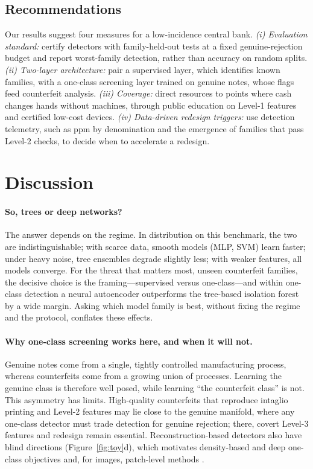 \documentclass{article}
\theoremstyle{definition}
\theoremstyle{remark}
\begin{document}
\subsection{Recommendations}

Our results suggest four measures for a low-incidence central bank. \emph{(i) Evaluation standard:} certify detectors with family-held-out tests at a fixed genuine-rejection budget and report worst-family detection, rather than accuracy on random splits. \emph{(ii) Two-layer architecture:} pair a supervised layer, which identifies known families, with a one-class screening layer trained on genuine notes, whose flags feed counterfeit analysis. \emph{(iii) Coverage:} direct resources to points where cash changes hands without machines, through public education on Level-1 features and certified low-cost devices. \emph{(iv) Data-driven redesign triggers:} use detection telemetry, such as ppm by denomination and the emergence of families that pass Level-2 checks, to decide when to accelerate a redesign.

\section{Discussion}
\label{sec:discussion}

\paragraph{So, trees or deep networks?} The answer depends on the regime. In distribution on this benchmark, the two are indistinguishable; with scarce data, smooth models (MLP, SVM) learn faster; under heavy noise, tree ensembles degrade slightly less; with weaker features, all models converge. For the threat that matters most, unseen counterfeit families, the decisive choice is the framing---supervised versus one-class---and within one-class detection a neural autoencoder outperforms the tree-based isolation forest by a wide margin. Asking which model family is best, without fixing the regime and the protocol, conflates these effects.

\paragraph{Why one-class screening works here, and when it will not.} Genuine notes come from a single, tightly controlled manufacturing process, whereas counterfeits come from a growing union of processes. Learning the genuine class is therefore well posed, while learning ``the counterfeit class'' is not. This asymmetry has limits. High-quality counterfeits that reproduce intaglio printing and Level-2 features may lie close to the genuine manifold, where any one-class detector must trade detection for genuine rejection; there, covert Level-3 features and redesign remain essential. Reconstruction-based detectors also have blind directions (Figure~\ref{fig:toy}d), which motivates density-based and deep one-class objectives \citep{ruff2018deep} and, for images, patch-level methods \citep{roth2022towards}.
\end{document}
